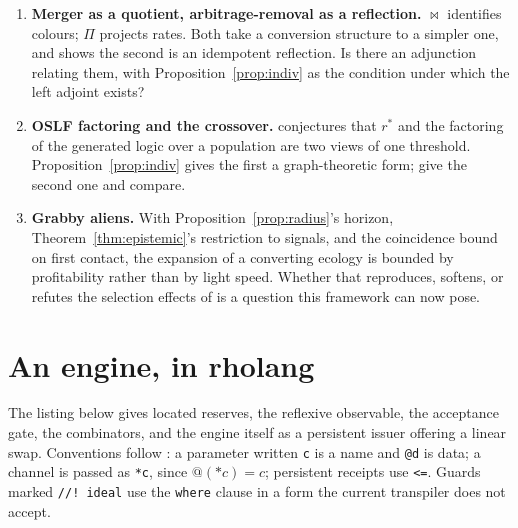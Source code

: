 \documentclass[11pt]{article}
\theoremstyle{plain}
\theoremstyle{definition}
\theoremstyle{remark}
\newcommand{\Merge}{\bowtie}
\begin{document}
\begin{enumerate}[itemsep=4pt]
a second source of the $\bot$ outcome that has nothing to do with budget,
and the learner cannot tell the two apart from inside. Budget-relative
refutation is therefore not well defined without a hypothesis about the
channel --- so a learner must do science on its own medium. This is a
correction owed to \cite[\S4]{scientist} rather than a problem for this
note, and we flag it here because this note is what raises it.
\item \textbf{Merger as a quotient, arbitrage-removal as a reflection.}
$\Merge$ identifies colours; $\Pi$ projects rates. Both take a conversion
structure to a simpler one, and \cite[\S4]{vtok} shows the second is an
idempotent reflection. Is there an adjunction relating them, with
Proposition~\ref{prop:indiv} as the condition under which the left adjoint
exists?
\item \textbf{OSLF factoring and the crossover.} \cite{compaut} conjectures
that $r^\ast$ and the factoring of the generated logic over a population
are two views of one threshold. Proposition~\ref{prop:indiv} gives the
first a graph-theoretic form; give the second one and compare.
\item \textbf{Grabby aliens.} With Proposition~\ref{prop:radius}'s horizon,
Theorem~\ref{thm:epistemic}'s restriction to signals, and the coincidence
bound on first contact, the expansion of a converting ecology is bounded by
profitability rather than by light speed. Whether that reproduces, softens,
or refutes the selection effects of \cite{hanson} is a question this
framework can now pose.
\end{enumerate}

\appendix

\section{An engine, in rholang}
\label{app:rho}

The listing below gives located reserves, the reflexive observable, the
acceptance gate, the combinators, and the engine itself as a persistent
issuer offering a linear swap. Conventions follow \cite{game}: a parameter
written \texttt{c} is a name and \texttt{@d} is data; a channel is passed as
\texttt{*c}, since $@(*c) = c$; persistent receipts use \texttt{<=}.
Guards marked \texttt{//! ideal} use the \texttt{where} clause in a form the
current transpiler does not accept.


\end{document}
